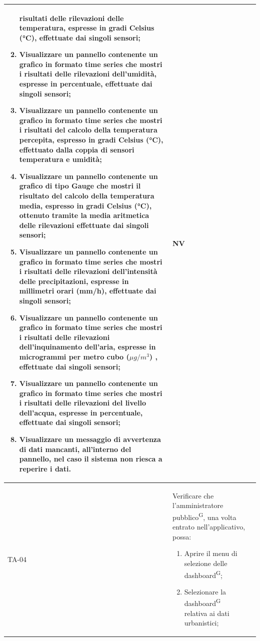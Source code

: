 \documentclass[8pt]{article}
\newcommand{\glossterm}[1]{#1\textsuperscript{G}} %
\begin{document}
\begin{longtable}{|>{\centering}p{2cm}|>{\RaggedRight}m{12cm}|>{\centering\arraybackslash}p{2cm}|}
\begin{enumerate}
            risultati delle rilevazioni delle temperatura, espresse in gradi Celsius (°C),
            effettuate dai singoli sensori;
        \item Visualizzare un pannello contenente un grafico in formato time series che mostri i
            risultati delle rilevazioni dell’umidità, espresse in percentuale, effettuate dai
            singoli sensori;
        \item Visualizzare un pannello contenente un grafico in formato time series che mostri i
            risultati del calcolo della temperatura percepita, espresso in gradi Celsius (°C),
            effettuato dalla coppia di sensori temperatura e umidità;
        \item Visualizzare un pannello contenente un grafico di tipo Gauge che mostri il risultato
            del calcolo della temperatura media, espresso in gradi Celsius (°C), ottenuto tramite la
            media aritmetica delle rilevazioni effettuate dai singoli sensori;
        \item Visualizzare un pannello contenente un grafico in formato time series che mostri i
            risultati delle rilevazioni dell’intensità delle precipitazioni, espresse in millimetri orari (mm/h), effettuate dai
            singoli sensori;
        \item Visualizzare un pannello contenente un grafico in formato time series che mostri i
            risultati delle rilevazioni dell’inquinamento dell'aria, espresse in microgrammi per metro cubo ($\mu g / m^3$) , effettuate dai
            singoli sensori;
        \item Visualizzare un pannello contenente un grafico in formato time series che mostri i
            risultati delle rilevazioni del livello dell'acqua, espresse in percentuale, effettuate dai
            singoli sensori;
        \item Visualizzare un messaggio di avvertenza di dati mancanti, all’interno del pannello, nel caso il sistema non riesca a reperire i dati.
    \end{enumerate}
    & NV \\
    \hline
    TA-04 & Verificare che l’\glossterm{amministratore pubblico}, una volta entrato nell'applicativo, possa:
    \begin{enumerate}
        \setlength\itemsep{0em}
        \item Aprire il menu di selezione delle \glossterm{dashboard};
        \item Selezionare la \glossterm{dashboard} relativa ai dati urbanistici;

\end{enumerate}
\end{longtable}
\end{document}
